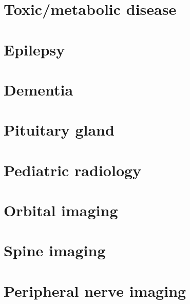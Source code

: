 \documentclass[oneside,a4paper,11pt,explicit,twocolumn]{book}
\begin{document}
\part{Toxic/metabolic disease}




\part{Epilepsy}





\part{Dementia}



\part{Pituitary gland}

\part{Pediatric radiology}











\part{Orbital imaging}

\part{Spine imaging}

\part{Peripheral nerve imaging}

\end{document}
